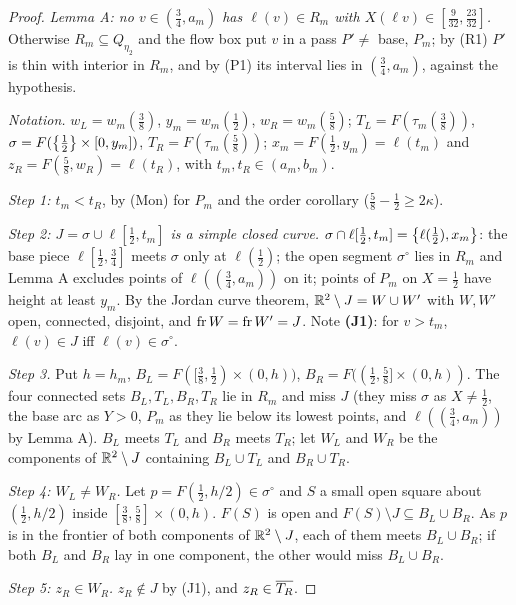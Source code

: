 \begin{proof}
\emph{Lemma A: no $v\in(\frac34,a_m)$ has $\ell(v)\in R_m$ with $X(\ell v)\in[\frac9{32},\frac{23}{32}]$.} Otherwise $R_m\subseteq Q_{\eta_2}$ and the flow box put $v$
in a pass $P'\ne$ base, $P_m$; by (R1) $P'$ is thin with interior in $R_m$, and by (P1) its interval lies in $(\frac34,a_m)$, against the
hypothesis.

\emph{Notation.} $w_L=w_m(\frac38)$, $y_m=w_m(\frac12)$, $w_R=w_m(\frac58)$; $T_L=F(\tau_m(\frac38))$, $\sigma=F(\left\{ \frac12 \right\}\times[0,y_m])$, $T_R=F(\tau_m(\frac58))$;
$x_m=F(\frac12,y_m)=\ell(t_m)$ and $z_R=F(\frac58,w_R)=\ell(t_R)$, with $t_m,t_R\in(a_m,b_m)$.

\emph{Step 1: $t_m<t_R$}, by (Mon) for $P_m$ and the order corollary ($\frac58-\frac12\ge2\kappa$).

\emph{Step 2: $J=\sigma\cup\ell[\frac12,t_m]$ is a simple closed curve.} $\sigma\cap\ell[\frac12,t_m]=\left\{ \ell(\frac12),x_m \right\}$: the base piece $\ell[\frac12,\frac34]$
meets $\sigma$ only at $\ell(\frac12)$; the open segment $\sigma^\circ$ lies in $R_m$ and Lemma A excludes points of $\ell((\frac34,a_m))$ on it; points of $P_m$
on $X=\frac12$ have height at least $y_m$. By the Jordan curve theorem, $\mathbb{R}^2\setminus J=W\cup W'$ with $W,W'$ open, connected, disjoint, and
$\operatorname{fr} W=\operatorname{fr} W'=J$. Note \textbf{(J1)}: for $v>t_m$, $\ell(v)\in J$ iff $\ell(v)\in\sigma^\circ$.

\emph{Step 3.} Put $h=h_m$, $B_L=F([\frac38,\frac12)\times(0,h))$, $B_R=F((\frac12,\frac58]\times(0,h))$. The four connected sets $B_L,T_L,B_R,T_R$ lie in $R_m$
and miss $J$ (they miss $\sigma$ as $X\ne\frac12$, the base arc as $Y>0$, $P_m$ as they lie below its lowest points, and $\ell((\frac34,a_m))$ by
Lemma A). $B_L$ meets $T_L$ and $B_R$ meets $T_R$; let $W_L$ and $W_R$ be the components of $\mathbb{R}^2\setminus J$ containing $B_L\cup T_L$ and $B_R\cup T_R$.

\emph{Step 4: $W_L\ne W_R$.} Let $p=F(\frac12,h/2)\in\sigma^\circ$ and $S$ a small open square about $(\frac12,h/2)$ inside $[\frac38,\frac58]\times(0,h)$. $F(S)$ is
open and $F(S)\setminus J\subseteq B_L\cup B_R$. As $p$ is in the frontier of both components of $\mathbb{R}^2\setminus J$, each of them meets $B_L\cup B_R$; if both
$B_L$ and $B_R$ lay in one component, the other would miss $B_L\cup B_R$.

\emph{Step 5: $z_R\in W_R$.} $z_R\notin J$ by (J1), and $z_R\in\overline{T_R}$.


\end{proof}
